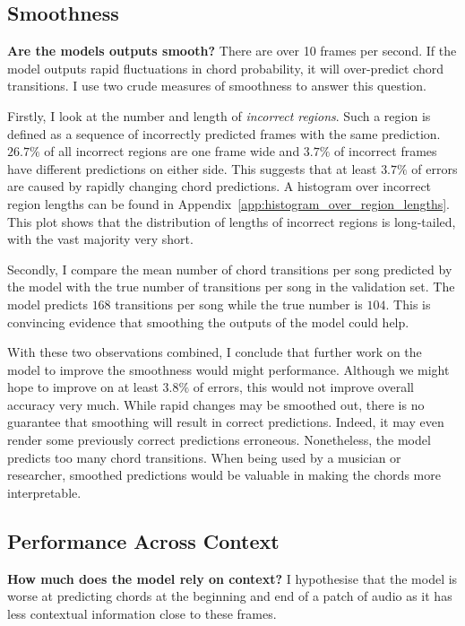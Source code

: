 \subsection{Smoothness}\label{sec:smoothness}

\textbf{Are the models outputs smooth?} There are over 10 frames per second. If the model outputs rapid fluctuations in chord probability, it will over-predict chord transitions. I use two crude measures of smoothness to answer this question.

Firstly, I look at the number and length of \emph{incorrect regions}. Such a region is defined as a sequence of incorrectly predicted frames with the same prediction. $26.7\%$ of all incorrect regions are one frame wide and $3.7\%$ of incorrect frames have different predictions on either side. This suggests that at least $3.7\%$ of errors are caused by rapidly changing chord predictions. A histogram over incorrect region lengths can be found in Appendix~\ref{app:histogram_over_region_lengths}. This plot shows that the distribution of lengths of incorrect regions is long-tailed, with the vast majority very short.

Secondly, I compare the mean number of chord transitions per song predicted by the model with the true number of transitions per song in the validation set. The model predicts $168$ transitions per song while the true number is $104$. This is convincing evidence that smoothing the outputs of the model could help. 

With these two observations combined, I conclude that further work on the model to improve the smoothness would might performance. Although we might hope to improve on at least $3.8\%$ of errors, this would not improve overall accuracy very much. While rapid changes may be smoothed out, there is no guarantee that smoothing will result in correct predictions. Indeed, it may even render some previously correct predictions erroneous. Nonetheless, the model predicts too many chord transitions. When being used by a musician or researcher, smoothed predictions would be valuable in making the chords more interpretable.

\subsection{Performance Across Context}\label{sec:crnn_performance_across_context}

\textbf{How much does the model rely on context?} I hypothesise that the model is worse at predicting chords at the beginning and end of a patch of audio as it has less contextual information close to these frames. 

